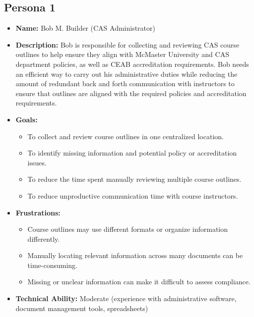 \documentclass[12pt]{article}
\begin{document}
\subsection{Persona 1}
\begin{itemize}
\item \textbf{Name:} Bob M. Builder (CAS Administrator)
\item \textbf{Description:} Bob is responsible for collecting and reviewing CAS course outlines 
to help ensure they align with McMaster University and CAS department policies, as well 
as CEAB accreditation requirements. Bob needs an efficient way to carry out his 
administrative duties while reducing the amount of redundant back and forth communication 
with instructors to ensure that outlines are aligned with the required policies and accreditation requirements.

\item \textbf{Goals:} 
\begin{itemize}
  \item To collect and review course outlines in one centralized location.
  \item To identify missing information and potential policy or accreditation issues.
  \item To reduce the time spent manually reviewing multiple course outlines.
  \item To reduce unproductive communication time with course instructors.
\end{itemize}
\item \textbf{Frustrations:}
\begin{itemize}
  \item Course outlines may use different formats or organize information differently.
  \item Manually locating relevant information across many documents can be time-consuming.
  \item Missing or unclear information can make it difficult to assess compliance.
\end{itemize}
\item \textbf{Technical Ability:} Moderate (experience with administrative software, document management tools, spreadsheets)
\end{itemize}
\end{document}
